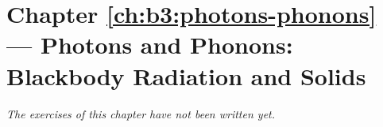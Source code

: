 \section*{Chapter \ref{ch:b3:photons-phonons} --- Photons and Phonons: Blackbody Radiation and Solids}


\emph{The exercises of this chapter have not been written yet.}
